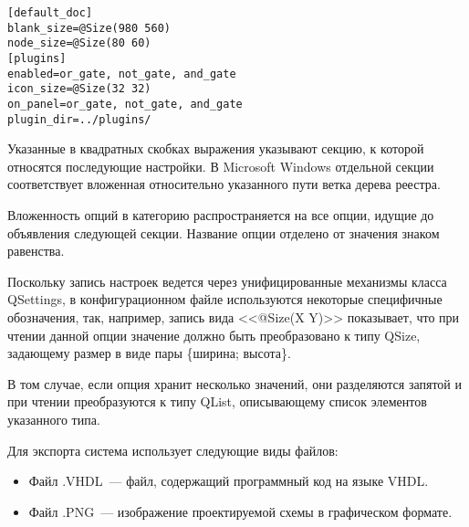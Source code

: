 \begin{lstlisting}
[default_doc]
blank_size=@Size(980 560)
node_size=@Size(80 60)
[plugins]
enabled=or_gate, not_gate, and_gate
icon_size=@Size(32 32)
on_panel=or_gate, not_gate, and_gate
plugin_dir=../plugins/
\end{lstlisting}

Указанные в квадратных скобках выражения указывают секцию, к которой относятся последующие настройки.
В Microsoft Windows отдельной секции соответствует вложенная относительно указанного пути ветка дерева реестра.

Вложенность опций в категорию распространяется на все опции, идущие до объявления следующей секции.
Название опции отделено от значения знаком равенства.

Поскольку запись настроек ведется через унифицированные механизмы класса QSettings, в конфигурационном файле используются некоторые специфичные обозначения, так, например, запись вида <<@Size(X Y)>> показывает, что при чтении данной опции значение должно быть преобразовано к типу QSize, задающему размер в виде пары \{ширина; высота\}.

В том случае, если опция хранит несколько значений, они разделяются запятой и при чтении преобразуются к типу QList, описывающему список элементов указанного типа.

Для экспорта система использует следующие виды файлов:
\begin{itemize}
  \item Файл .VHDL~--- файл, содержащий программный код на языке VHDL.
  \item Файл .PNG~--- изображение проектируемой схемы в графическом формате.
\end{itemize}